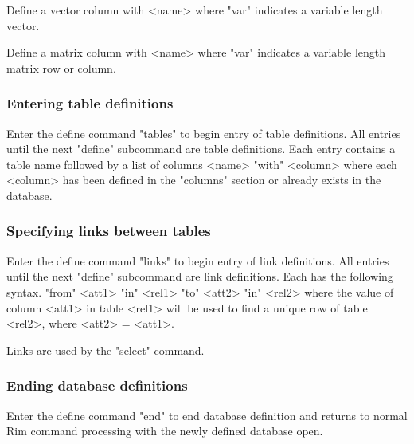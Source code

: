 Define a vector column with
\<<name>
            \>
where "var" indicates a variable length vector.
 
Define a matrix column with
\<<name>
            \>
where "var" indicates a variable length matrix row or column.
 
 
\subsubsection{Entering table definitions}
%
Enter the define command
\<"tables"\>
to begin entry of table definitions.
All entries until the next "define" subcommand
are table definitions.
Each entry contains a table name followed by a list of columns
\<<name> "with" <column> \>
where each <column> has been defined in the
"columns" section or already exists in the database.
 
\subsubsection{Specifying links between tables}
%
Enter the define command
\<"links"\>
to begin entry of link definitions.
All entries until the next "define" subcommand
are link definitions.
Each has the following syntax.
 "from" <att1> "in" <rel1> "to" <att2> "in" <rel2>\>
where the value of column <att1> in table <rel1>
will be used to find a unique row of table <rel2>,
where <att2> = <att1>.
 
 
Links are used by the "select" command.
 
 
\subsubsection{Ending database definitions}
%
Enter the define command
\<"end" \>
to end database definition and returns to normal Rim command
processing with the newly defined database open.
 
